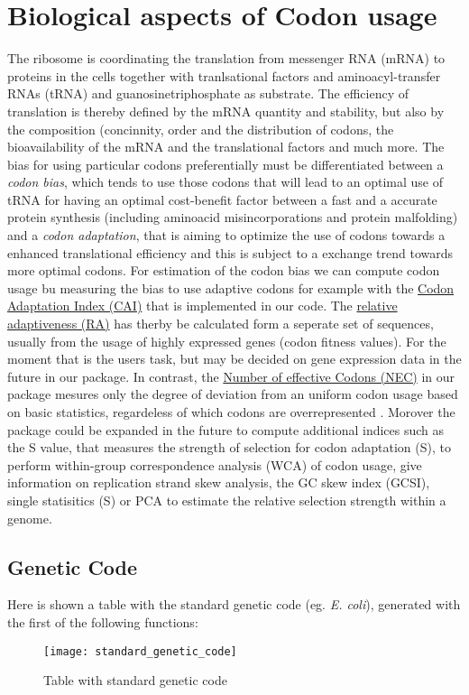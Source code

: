 \section{Biological aspects of Codon usage}
The ribosome is coordinating the translation from messenger RNA (mRNA) to proteins in the cells together with tranlsational factors and aminoacyl-transfer RNAs (tRNA) and guanosinetriphosphate as substrate. The efficiency of translation is thereby defined by the mRNA quantity and stability, but also by the composition (concinnity, order and the distribution of codons, the bioavailability of the mRNA and the translational factors and much more. The bias for using particular codons preferentially must be differentiated between a \textit{codon bias}, which tends to use those codons that will lead to an optimal use of tRNA for having an optimal cost-benefit factor between a fast and a accurate protein synthesis (including aminoacid misincorporations and protein malfolding) and a \textit{codon adaptation}, that is aiming to optimize the use of codons towards a enhanced translational efficiency and this is subject to a exchange trend towards more optimal codons.
For estimation of the codon bias we can compute codon usage bu measuring the bias to use adaptive codons for example with the \hyperlink{function:CAI}{Codon Adaptation Index (CAI)} that is implemented in our code. The \hyperlink{function:RA}{relative adaptiveness (RA)} has therby be calculated form a seperate set of sequences, usually from the usage of highly expressed genes (codon fitness values). For the moment that is the users task, but may be decided on gene expression data in the future in our package. In contrast, the 
\hyperlink{function:NEC}{Number of effective Codons (NEC)} in our package mesures only the degree of deviation from an uniform codon usage based on basic statistics, regardeless of which codons are overrepresented \cite{Suzuki2016}.
Morover the package could be expanded in the future to compute additional indices such as the S value, that measures the strength of selection for codon adaptation (S), to perform within-group correspondence analysis (WCA) of codon usage, give information on replication strand skew analysis, the GC skew index (GCSI), single statisitics (S) or PCA to estimate the relative selection strength within a genome.

\subsection{Genetic Code}
Here is shown a table with the standard genetic code (eg. \textit{E. coli}), generated with the first of the following functions:  
  

\begin{figure}[tb] 
\centering 
\texttt{[image: standard\_genetic\_code]} 
\caption[Genetic code table]{Table with standard genetic code}
\label{fig:sgencod} 
\end{figure}


